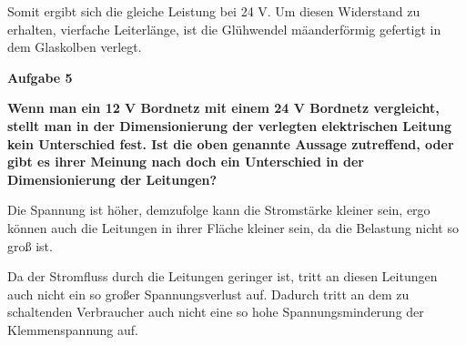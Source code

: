 Somit ergibt sich die gleiche Leistung bei 24 V. Um diesen Widerstand zu
erhalten, vierfache Leiterlänge, ist die Glühwendel mäanderförmig
gefertigt in dem Glaskolben verlegt.

\textbf{Aufgabe 5}

\textbf{Wenn man ein 12 V Bordnetz mit einem 24 V Bordnetz vergleicht,
stellt man in der Dimensionierung der verlegten elektrischen Leitung
kein Unterschied fest. Ist die oben genannte Aussage zutreffend, oder
gibt es ihrer Meinung nach doch ein Unterschied in der Dimensionierung
der Leitungen?}

Die Spannung ist höher, demzufolge kann die Stromstärke kleiner sein,
ergo können auch die Leitungen in ihrer Fläche kleiner sein, da die
Belastung nicht so groß ist.

Da der Stromfluss durch die Leitungen geringer ist, tritt an diesen
Leitungen auch nicht ein so großer Spannungsverlust auf. Dadurch tritt
an dem zu schaltenden Verbraucher auch nicht eine so hohe
Spannungsminderung der Klemmenspannung auf.
